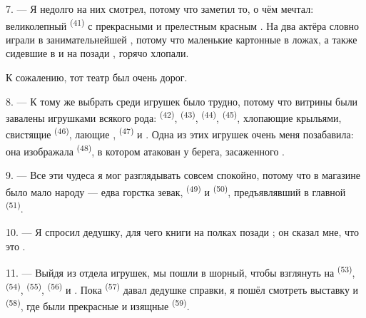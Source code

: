 7. --- Я недолго на них смотрел, потому что заметил то, о чём мечтал:
великолепный  \textsuperscript{(41)} с прекрасными
 и прелестным красным . На
 два актёра словно играли  в занимательнейшей
, потому что маленькие картонные  в ложах, а
также сидевшие в  и на  позади
, горячо хлопали.

К сожалению, тот театр был очень дорог.

8. --- К тому же выбрать среди игрушек было трудно, потому что витрины были
завалены игрушками всякого рода:  \textsuperscript{(42)},
 \textsuperscript{(43)},  \textsuperscript{(44)},
 \textsuperscript{(45)}, хлопающие крыльями, свистящие
 \textsuperscript{(46)}, лающие ,
 \textsuperscript{(47)} и . Одна из этих
игрушек очень меня позабавила: она изображала 
\textsuperscript{(48)}, в котором  атакован  у
берега, засаженного .


9. --- Все эти чудеса я мог разглядывать совсем спокойно, потому что в
магазине было мало народу --- едва горстка зевак, 
\textsuperscript{(49)} и  \textsuperscript{(50)}, предъявлявший
 в главной  \textsuperscript{(51)}.

10. --- Я спросил дедушку, для чего книги на полках позади ;
он сказал мне, что это .

\VUsaut{3.6mm}
\VUsaut{2.8mm}

11. --- Выйдя из отдела игрушек, мы пошли в шорный, чтобы взглянуть на
 \textsuperscript{(53)},  \textsuperscript{(54)},
 \textsuperscript{(55)},  \textsuperscript{(56)} и
. Пока  \textsuperscript{(57)} давал
дедушке справки, я пошёл смотреть выставку  и
 \textsuperscript{(58)}, где были прекрасные  и
изящные  \textsuperscript{(59)}.


